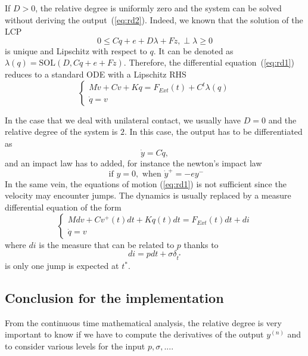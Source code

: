 If $D>0$, the relative degree is uniformly zero and the system can be solved without deriving the output~(\ref{eq:rd2}). Indeed, we known that the solution of the LCP
\begin{equation}
  0\leq Cq + e + D \lambda + Fz, \perp \lambda \geq 0
\label{eq:rd5}  
\end{equation}
is unique and Lipschitz with respect to $q$. It can be denoted as $\lambda(q) = \mbox{SOL}(D,Cq + e +Fz)$. Therefore, the differential equation~(\ref{eq:rd1}) reduces to a standard ODE with a Lipschitz RHS
 \begin{equation}
  \label{eq:rd6}
  \begin{cases}
    M \dot v + C v + K q = F_{Ext}(t) + C^t \lambda(q)  \\
    \dot q = v
  \end{cases}
\end{equation}

In the case that we deal with unilateral contact, we usually have $D=0$ and the relative degree of the system is $2$. In this case, the output has to be differentiated as
\begin{equation}
  \label{eq:rd7}
   \dot y= C \dot q,
\end{equation}
and an impact law has to added, for instance the newton's impact law
\begin{equation}
  \label{eq:rd8}
  \text{ if } y=0, \text{ when } \dot y^+= -e y^-
\end{equation}
In the same vein, the equations of motion (\ref{eq:rd1}) is not sufficient since the velocity may encounter jumps. The dynamics is usually replaced by a measure differential equation of the form
\begin{equation}
  \label{eq:rd10}
  \begin{cases}
    M dv + C v^+(t) dt + K q(t) dt = F_{Ext}(t)dt + di \\
    \dot q = v
  \end{cases}
\end{equation}
where $di$ is the measure that can be related to $p$ thanks to
\begin{equation}
  \label{eq:rd11}
  di = p dt + \sigma \delta _{t^*}
\end{equation}
is only one jump is expected at ${t^*}$.


\subsection{Conclusion for the implementation}
From the continuous time mathematical analysis, the relative degree is very important to know if we have to compute the derivatives of the output $y^{(n)}$ and to consider various levels for the input $p , \sigma, ....$

